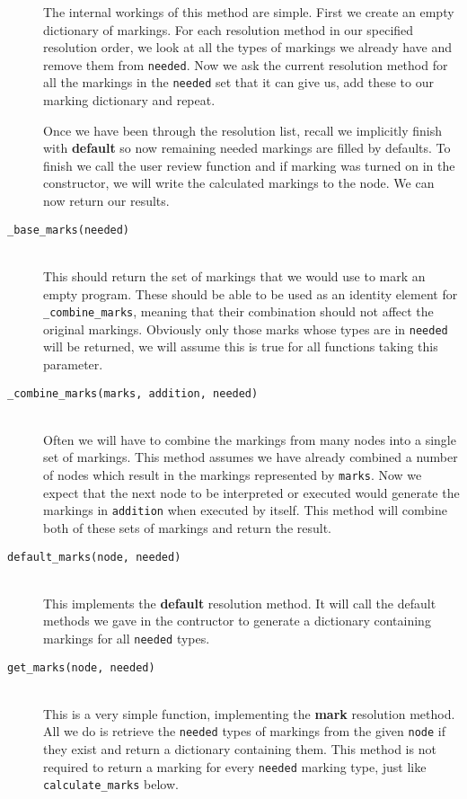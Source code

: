 \documentclass{report}
\begin{document}
\begin{description}
The internal workings of this method are simple. First we create an empty dictionary of markings. For each resolution method in our specified resolution
order, we look at all the types of markings we already have and remove them from \texttt{needed}. Now we ask the current resolution method for all the
markings in the \texttt{needed} set that it can give us, add these to our marking dictionary and repeat.

Once we have been through the resolution list, recall we implicitly finish with \textbf{default} so now remaining needed markings are filled by defaults.
To finish we call the user review function and if marking was turned on in the constructor, we will write the calculated markings to the node. We can now
return our results.

\item[\texttt{\_base\_marks(needed)}] \hfill \\
This should return the set of markings that we would use to mark an empty program. These should be able to be used as an identity element for
\texttt{\_combine\_marks}, meaning that their combination should not affect the original markings. Obviously only those marks whose types are in
\texttt{needed} will be returned, we will assume this is true for all functions taking this parameter.

\item[\texttt{\_combine\_marks(marks, addition, needed)}] \hfill \\
Often we will have to combine the markings from many nodes into a single set of markings. This method assumes we have already combined a number of nodes
which result in the markings represented by \texttt{marks}. Now we expect that the next node to be interpreted or executed would generate the markings
in \texttt{addition} when executed by itself. This method will combine both of these sets of markings and return the result.

\item[\texttt{default\_marks(node, needed)}] \hfill \\
This implements the \textbf{default} resolution method. It will call the default methods we gave in the contructor to generate a dictionary containing
markings for all \texttt{needed} types.

\item[\texttt{get\_marks(node, needed)}] \hfill \\
This is a very simple function, implementing the \textbf{mark} resolution method. All we do is retrieve the \texttt{needed} types of markings from the
given \texttt{node} if they exist and return a dictionary containing them. This method is not required to return a marking for every \texttt{needed}
marking type, just like \texttt{calculate\_marks} below.


\end{description}
\end{document}
